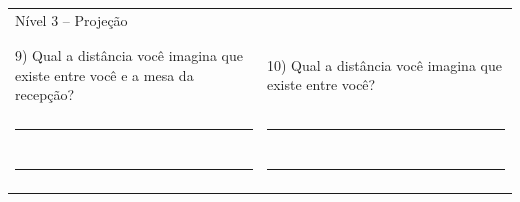 \begin{table}[!htb]
\begin{tabular}{p{0.5\linewidth} p{0.5\linewidth}}
    \end{tabular}
    \begin{tabular}{p{0.5\linewidth} p{0.5\linewidth}}
        \large{Nível 3 – Projeção}  &\\
        & \\
        & \\
        9)	Qual a distância você imagina que existe entre você e a mesa da recepção? & 10)	Qual a distância você imagina que existe entre você? \\
        & \\
        \rule{\linewidth}{.2mm} & \rule{\linewidth}{.2mm}\\
        & \\
        \rule{\linewidth}{.2mm} & \rule{\linewidth}{.2mm}\\
        & \\
    \end{tabular}
\end{table}

\FloatBarrier
\pagebreak
